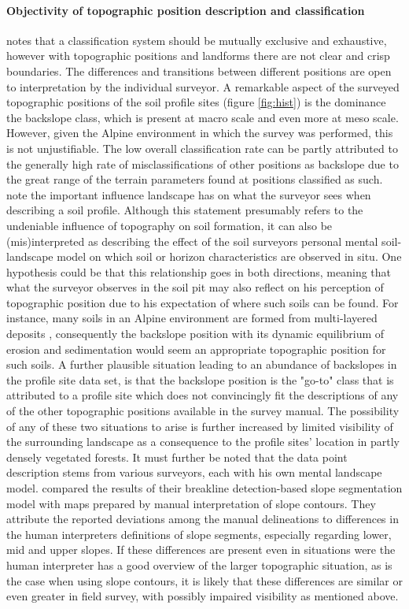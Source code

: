 \documentclass[final,1p,times,twocolumn,authoryear]{elsarticle}
\begin{document}
\paragraph{Objectivity of topographic position description and classification}
notes that a classification system should be mutually exclusive and exhaustive, however with topographic positions and landforms there are not clear and crisp boundaries. The differences and transitions between different positions are open to interpretation by the individual surveyor. A remarkable aspect of the surveyed topographic positions of the soil profile sites (figure \ref{fig:hist}) is the dominance the backslope class, which is present at macro scale and even more at meso scale. However, given the Alpine environment in which the survey was performed, this is not unjustifiable. The low overall classification rate can be partly attributed to the generally high rate of misclassifications of other positions as backslope due to the great range of the terrain parameters found at positions classified as such. \cite{Brevik2015} note the important influence landscape has on what the surveyor sees when describing a soil profile. Although this statement presumably refers to the undeniable influence of topography on soil formation, it can also be (mis)interpreted as describing the effect of the soil surveyors personal mental soil-landscape model on which soil or horizon characteristics are observed in situ. One hypothesis could be that this relationship goes in both directions, meaning that what the surveyor observes in the soil pit may also reflect on his perception of topographic position due to his expectation of where such soils can be found. For instance, many soils in an Alpine environment are formed from multi-layered deposits \citep{Baruck2015,Geitner2011a}, consequently the backslope position with its dynamic equilibrium of erosion and sedimentation would seem an appropriate topographic position for such soils. A further plausible situation leading to an abundance of backslopes in the profile site data set, is that the backslope position is the "go-to" class that is attributed to a profile site which does not convincingly fit the descriptions of any of the other topographic positions available in the survey manual. The possibility of any of these two situations to arise is further increased by limited visibility of the surrounding landscape as a consequence to the profile sites' location in partly densely vegetated forests. It must further be noted that the data point description stems from various surveyors, each with his own mental landscape model. \cite{Matsuura2012} compared the results of their breakline detection-based slope segmentation model with maps prepared by manual interpretation of slope contours. They attribute the reported deviations among the manual delineations to differences in the human interpreters definitions of slope segments, especially regarding lower, mid and upper slopes. If these differences are present even in situations were the human interpreter has a good overview of the larger topographic situation, as is the case when using slope contours, it is likely that these differences are similar or even greater in field survey, with possibly impaired visibility as mentioned above. 
\end{document}
